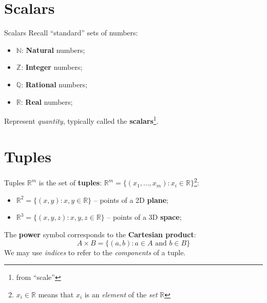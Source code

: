 \documentclass[10pt]{beamer}
\begin{document}
\section{Scalars}
\begin{frame}{Scalars}
    Recall ``standard'' sets of numbers:

    \begin{itemize}
        \item $\mathbb N$: \textbf{Natural} numbers;
        \item $\mathbb Z$: \textbf{Integer} numbers;
        \item $\mathbb Q$: \textbf{Rational} numbers;
        \item $\mathbb R$: \textbf{Real} numbers;
    \end{itemize}

    Represent \textit{quantity}, typically called the \textbf{scalars}\footnote{from ``scale''}.
\end{frame}

\section{Tuples}
\begin{frame}{Tuples}
    $\mathbb R^m$ is the set of \textbf{tuples}: $\mathbb R^m = \{(x_1,\dots,x_m) : x_i \in \mathbb R\}$\footnote{$x_i \in \mathbb R$ means that $x_i$ is an \textit{element} of the \textit{set} $\mathbb R$}:

    \begin{itemize}
        \item $\mathbb R^2 = \{(x, y) : x, y \in \mathbb R\}$ -- points of a 2D \textbf{plane};
        \item $\mathbb R^3 = \{(x, y, z): x, y, z \in \mathbb R\}$ -- points of a 3D \textbf{space};
    \end{itemize}

    The \textbf{power} symbol corresponds to the \textbf{Cartesian product}:
    $$
    A \times B = \{(a, b) : a \in A \text{ and } b \in B\}
    $$
    We may use \textit{indices} to refer to the \textit{components} of a tuple.
\end{frame}
\end{document}
